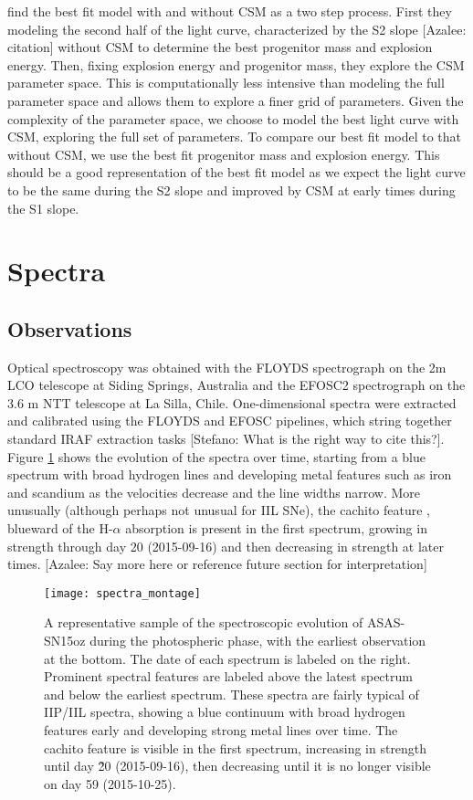 \documentclass[preprint]{aastex61}
\newcommand{\azaleecomment}[1]{{\color{red} [{#1}]}}
\newcommand{\Azalee}[1]{\azaleecomment{Azalee: #1}}
\newcommand{\stefanocomment}[1]{{\color{cyan} [{#1}]}}
\newcommand{\Stefano}[1]{\stefanocomment{Stefano: #1}}
\begin{document}
\citet{2018morozova} find the best fit model with and without CSM as a two step process. 
First they modeling the second half of the light curve, characterized by the S2 slope \Azalee{citation} without CSM to determine the best progenitor mass and explosion energy. 
Then, fixing explosion energy and progenitor mass, they explore the CSM parameter space. 
This is computationally less intensive than modeling the full parameter space and allows them to explore a finer grid of parameters.
Given the complexity of the parameter space, we choose to model the best light curve with CSM, exploring the full set of parameters. 
To compare our best fit model to that without CSM, we use the best fit progenitor mass and explosion energy. 
This should be a good representation of the best fit model as we expect the light curve to be the same during the S2 slope and improved by CSM at early times during the S1 slope.

\section{Spectra}
\subsection{Observations}
Optical spectroscopy was obtained with the FLOYDS spectrograph on the 2m LCO telescope at Siding Springs, Australia and the EFOSC2 spectrograph on the 3.6 m NTT telescope at La Silla, Chile. 
One-dimensional spectra were extracted and calibrated using the FLOYDS \citep{2014valenti} and EFOSC pipelines, which string together standard IRAF extraction tasks \Stefano{What is the right way to cite this?}. 
Figure \ref{fig:SpecAll} shows the evolution of the spectra over time, starting from a blue spectrum with broad hydrogen lines and developing metal features such as iron and scandium as the velocities decrease and the line widths narrow. More unusually (although perhaps not unusual for IIL SNe), the cachito feature \citep{2017gutierrez}, blueward of the H-$\alpha$ absorption is present in the first spectrum, growing in strength through day 20 (2015-09-16) and then decreasing in strength at later times. \Azalee{Say more here or reference future section for interpretation}

\begin{figure}[h!]
\begin{center}
\texttt{[image: spectra\_montage]} %
\caption{A representative sample of the spectroscopic evolution of ASAS-SN15oz during the photospheric phase, with the earliest observation at the bottom. 
The date of each spectrum is labeled on the right. Prominent spectral features are labeled above the latest spectrum and below the earliest spectrum. 
These spectra are fairly typical of IIP/IIL spectra, showing a blue continuum with broad hydrogen features early and developing strong metal lines over time.
The cachito feature is visible in the first spectrum, increasing in strength until day \~20 (2015-09-16), then decreasing until it is no longer visible on day 59 (2015-10-25).}
\label{fig:SpecAll}
\end{center}
\end{figure}
\end{document}
